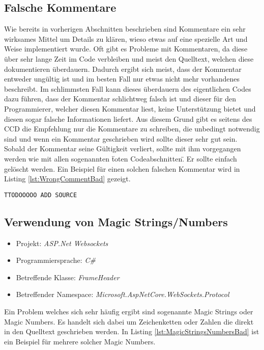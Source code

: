 \subsection{Falsche Kommentare}
\SuperPar Wie bereits in vorherigen Abschnitten beschrieben sind Kommentare ein sehr wirksames Mittel um Details zu klären, wieso etwas auf eine spezielle Art und Weise implementiert wurde. Oft gibt es Probleme mit Kommentaren, da diese über sehr lange Zeit im Code verbleiben und meist den Quelltext, welchen diese dokumentieren überdauern. Dadurch ergibt sich meist, dass der Kommentar entweder ungültig ist und im besten Fall nur etwas nicht mehr vorhandenes beschreibt. Im schlimmsten Fall kann dieses überdauern des eigentlichen Codes dazu führen, dass der Kommentar schlichtweg falsch ist und dieser für den Programmierer, welcher diesen Kommentar liest, keine Unterstützung bietet und diesen sogar falsche Informationen liefert. Aus diesem Grund gibt es seitens des CCD die Empfehlung nur die Kommentare zu schreiben, die unbedingt notwendig sind und wenn ein Kommentar geschrieben wird sollte dieser sehr gut sein. Sobald der Kommentar seine Gültigkeit verliert, sollte mit ihm vorgegangen werden wie mit allen sogenannten \"toten Codeabschnitten\". Er sollte einfach gelöscht werden. Ein Beispiel für einen solchen falschen Kommentar wird in Listing \ref{lst:WrongCommentBad} gezeigt.

\begin{lstlisting}[language={[Sharp]C}, caption=Falscher Kommentar, label=lst:WrongCommentBad]
        TTODOOOOO ADD SOURCE
\end{lstlisting}



\subsection{Verwendung von Magic Strings/Numbers}
\begin{itemize}
	\item Projekt: \textit{ASP.Net Websockets}
	\item Programmiersprache: \textit{C\#}
	\item Betreffende Klasse: \textit{FrameHeader}
	\item Betreffender Namespace: \textit{Microsoft.AspNetCore.WebSockets.Protocol}
\end{itemize}

\SuperPar Ein Problem welches sich sehr häufig ergibt sind sogenannte Magic Strings oder Magic Numbers. Es handelt sich dabei um Zeichenketten oder Zahlen die direkt in den Quelltext geschrieben werden. In Listing \ref{lst:MagicStringsNumbersBad} ist ein Beispiel für mehrere solcher Magic Numbers.

